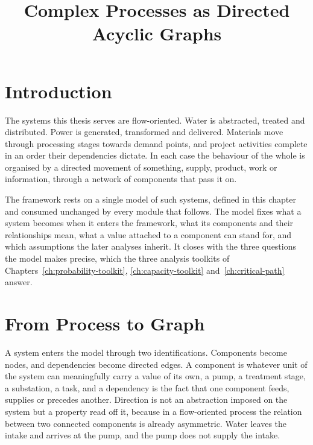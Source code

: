 \documentclass[12pt]{report}
\begin{document}
\title{Complex Processes as Directed Acyclic Graphs}
\fi

\section{Introduction}
\label{sec:model-intro}

The systems this thesis serves are flow-oriented. Water is abstracted,
treated and distributed. Power is generated, transformed and delivered.
Materials move through processing stages towards demand points, and
project activities complete in an order their dependencies dictate. In
each case the behaviour of the whole is organised by a directed movement
of something, supply, product, work or information, through a network of
components that pass it on.

The framework rests on a single model of such systems, defined in this
chapter and consumed unchanged by every module that follows. The model
fixes what a system becomes when it enters the framework, what its
components and their relationships mean, what a value attached to a
component can stand for, and which assumptions the later analyses inherit.
It closes with the three questions the model makes precise, which the
three analysis toolkits of Chapters~\ref{ch:probability-toolkit},
\ref{ch:capacity-toolkit} and~\ref{ch:critical-path} answer.

\section{From Process to Graph}
\label{sec:model-mapping}

A system enters the model through two identifications. Components become
nodes, and dependencies become directed edges. A component is whatever
unit of the system can meaningfully carry a value of its own, a pump, a
treatment stage, a substation, a task, and a dependency is the fact that
one component feeds, supplies or precedes another. Direction is not an
abstraction imposed on the system but a property read off it, because in
a flow-oriented process the relation between two connected components is
already asymmetric. Water leaves the intake and arrives at the pump, and
the pump does not supply the intake.
\end{document}
